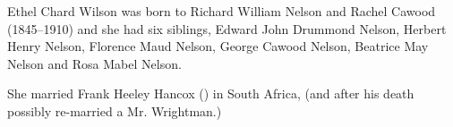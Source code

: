 Ethel Chard Wilson was born to  Richard William Nelson and Rachel Cawood (1845--1910) and she had six siblings,  Edward John Drummond Nelson, Herbert Henry Nelson, Florence Maud Nelson, George Cawood Nelson, Beatrice May Nelson and Rosa Mabel Nelson.

She married Frank Heeley Hancox () in South Africa, (and after his death possibly re-married  a Mr. Wrightman.)

